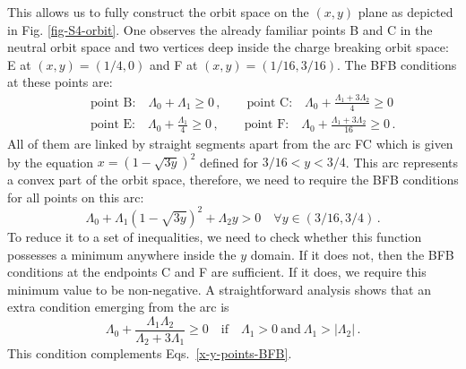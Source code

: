 \documentclass[11pt]{article}
\begin{document}
This allows us to fully construct the orbit space on the $(x,y)$ plane as depicted in Fig. \ref{fig-S4-orbit}.
One observes the already familiar points B and C in the neutral orbit space
and two vertices deep inside the charge breaking orbit space: 
E at $(x,y) = (1/4, 0)$ and F at $(x,y) = (1/16, 3/16)$. 
The BFB conditions at these points are:
\begin{eqnarray}
&&\mbox{point B:}\quad \Lambda_0 + \Lambda_1 \ge 0\,, \qquad 
\mbox{point C:}\quad \Lambda_0 + \frac{\Lambda_1 + 3\Lambda_2}{4} \ge 0\nonumber\\[2mm]
&&\mbox{point E:}\quad \Lambda_0 + \frac{\Lambda_1}{4} \ge 0\,, \qquad
\mbox{point F:} \quad \Lambda_0 + \frac{\Lambda_1 + 3\Lambda_2}{16} \ge 0\,.
\label{x-y-points-BFB}
\end{eqnarray}
All of them are linked by straight segments apart
from the arc FC which is given by the equation $x = (1 -\sqrt{3y})^2$ defined for
$3/16 < y < 3/4$.
This arc represents a convex part of the orbit space, therefore,
we need to require the BFB conditions for all points on this arc:
\begin{equation}
\Lambda_0 + \Lambda_1 (1 -\sqrt{3y})^2 + \Lambda_2 y > 0 \quad \forall y \in (3/16, 3/4)\,.
\end{equation}
To reduce it to a set of inequalities, we need to check whether this function
possesses a minimum anywhere inside the $y$ domain. 
If it does not, then the BFB conditions at the endpoints C and F are sufficient.
If it does, we require this minimum value to be non-negative.
A straightforward analysis shows that an extra condition emerging from the arc is
\begin{equation}
\Lambda_0 + \frac{\Lambda_1\Lambda_2}{\Lambda_2 + 3\Lambda_1} \ge 0 \quad
\mbox{if}\quad \Lambda_1 > 0 \ \mbox{and} \ \Lambda_1 > |\Lambda_2|\,.\label{arc-condition} 
\end{equation}
This condition complements Eqs.~\eqref{x-y-points-BFB}.
\end{document}

